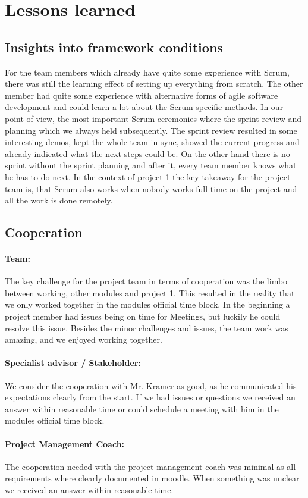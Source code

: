 \section{Lessons learned}\label{sec:lessons-learned}

\subsection{Insights into framework conditions}\label{subsec:insights-into-framework-conditions}
For the team members which already have quite some experience with Scrum,
there was still the learning effect of setting up everything from scratch.
The other member had quite some experience with alternative forms of agile software development and could learn a lot about the Scrum specific methods.
In our point of view, the most important Scrum ceremonies where the sprint review and planning
which we always held subsequently.
The sprint review resulted in some interesting demos, kept the whole team in sync, showed the current progress and
already indicated what the next steps could be.
On the other hand there is no sprint without the sprint planning and after it, every team member knows what he has to do next.
In the context of project 1 the key takeaway for the project team is, that Scrum also works when nobody works full-time
on the project and all the work is done remotely.

\subsection{Cooperation}\label{subsec:cooperation}
\paragraph{Team:}
The key challenge for the project team in terms of cooperation was the limbo between working, other modules and project 1.
This resulted in the reality that we only worked together in the modules official time block.
In the beginning a project member had issues being on time for Meetings, but luckily he could resolve this issue.
Besides the minor challenges and issues, the team work was amazing, and we enjoyed working together.

\paragraph{Specialist advisor / Stakeholder:}
We consider the cooperation with Mr. Kramer as good, as he communicated his expectations clearly from the start.
If we had issues or questions we received an answer within reasonable time or could schedule a meeting with him in the
modules official time block.

\paragraph{Project Management Coach:}
The cooperation needed with the project management coach was minimal as all requirements where clearly documented in moodle.
When something was unclear we received an answer within reasonable time.
